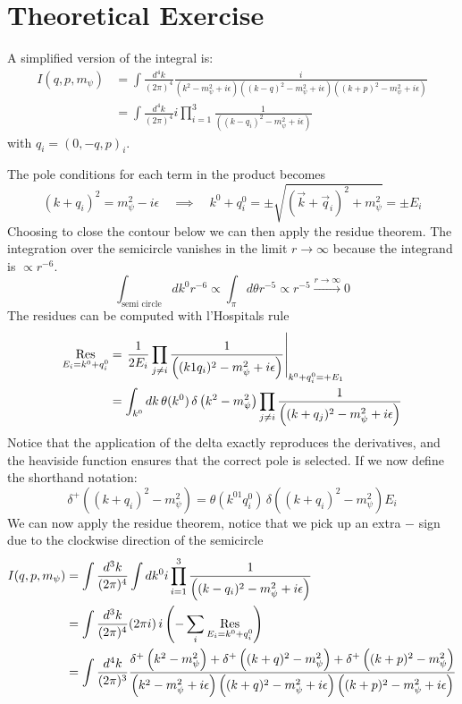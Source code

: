 \section{Theoretical Exercise}

A simplified version of the integral is:
\begin{align}
I(q,p,m_\psi)&=\int\frac{d^4k}{(2\pi)^4}
\frac{i}{\left(k^2-m_\psi^2+i\epsilon\right)\left((k-q)^2-m_\psi^2+i\epsilon\right)\left((k+p)^2-m_\psi^2+i\epsilon\right)}\\
&=\int\frac{d^4k}{(2\pi)^4}
i\prod_{i=1}^{3}\frac{1}{\left((k-q_i)^2-m_\psi^2+i\epsilon\right)}
\end{align}
with $q_i = (0,-q,p)_i$.

The pole conditions for each term in the product becomes
\begin{equation}
(k+q_i)^2 = m_\psi^2-i\epsilon \quad\implies\quad k^0+q_i^0 = \pm\sqrt{(\vec{k}+\vec{q}_i)^2+m_\psi^2} = \pm E_i
\end{equation}
Choosing to close the contour below we can then apply the residue theorem.
The integration over the semicircle vanishes in the limit $r\to\infty$ because the integrand is $\propto r^{-6}$.
\begin{equation}
    \int_{\text{semi circle}} dk^0 r^{-6} \propto \int_{\pi} d\theta r^{-5} \propto r^{-5} \overset{r\to\infty}{\longrightarrow} 0
\end{equation}
The residues can be computed with l'Hospitals rule
\begin{align}
\Op{Res}_{E_i=k^0+q_i^0}
    &= \left. \frac{1}{2 E_i} \prod_{j\neq i} \frac{1}{ \left((k1q_i)^2-m_\psi^2+i\epsilon\right)} \right|_{k^0+q_i^0 = +E_1}\\
    &= \int_{k^0} d k \, \theta(k^0) \, \delta\left(k^2 - m_\psi^2\right) \prod_{j\neq i}\frac{1}{\left((k+q_j)^2-m_\psi^2+i\epsilon\right)}
\end{align}
Notice that the application of the delta exactly reproduces the derivatives, and the heaviside function ensures that the correct pole is selected.
If we now define the shorthand notation:
\begin{equation}
    \delta^{+}\left((k+q_i)^2 - m_\psi^2 \right) = \theta(k^01q_i^0) \, \delta\left((k+q_i)^2 - m_\psi^2\right) E_i
\end{equation}
We can now apply the residue theorem, notice that we pick up an extra $-$ sign due to the clockwise direction of the semicircle
\begin{align*}
   I(q,p,m_\psi) &= \int\frac{d^3k}{(2\pi)^4} \int dk^0 i \prod_{i=1}^{3}\frac{1}{\left((k-q_i)^2-m_\psi^2+i\epsilon\right)}\\
    &= \int\frac{d^3k}{(2\pi)^4} (2\pi i) \, i \left( - \sum_i \Op{Res}_{E_i=k^0+q_i^0} \right)\\
    &= \int\frac{d^4k}{(2\pi)^3}
\frac{\delta^{+}\left( k^2 - m_\psi^2 \right)+\delta^{+}\left( (k+q)^2 - m_\psi^2 \right)+\delta^{+}\left( (k+p)^2 - m_\psi^2 \right)}{\left(k^2-m_\psi^2+i\epsilon\right)\left((k+q)^2-m_\psi^2+i\epsilon\right)\left((k+p)^2-m_\psi^2+i\epsilon\right)}
\end{align*}
